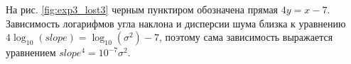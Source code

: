 \documentclass[specialist, substylefile = spbureport.rtx,
    subf,href,colorlinks=true, 12pt]{disser}
\newcommand{\F}{\mathsf{F}}
\newcommand{\sfS}{\mathsf{S}}
\newcommand{\sfR}{\mathsf{R}}
\begin{document}
        На рис. \ref{fig:exp3_lost3} черным пунктиром обозначена прямая $4y = x - 7$. Зависимость логарифмов угла наклона и дисперсии шума близка к уравнению $4\log_{10}(slope) = \log_{10}(\sigma^2) - 7$, поэтому сама зависимость выражается уравнением $slope^4 = 10^{-7}\sigma^2$.




        

        






\end{document}
